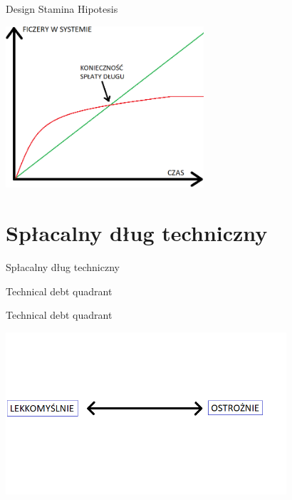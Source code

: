 \documentclass{beamer}
\begin{document}
\begin{frame}{Design Stamina Hipotesis}
\begin{center}
  	\includegraphics[height=6cm]{design_stability_hipotesis4.png}
\end{center}
\end{frame}

\section{Spłacalny dług techniczny}

\begin{frame}{}
\begin{center}
\Huge{Spłacalny dług techniczny}
\end{center}
\end{frame}

\begin{frame}{}
\begin{center}
\Huge{Technical debt quadrant}
\end{center}
\end{frame}

\begin{frame}{Technical debt quadrant}
\begin{center}
  	\includegraphics[height=6cm]{technical_debt_quadrant1.png}
\end{center}
\end{frame}
\end{document}
